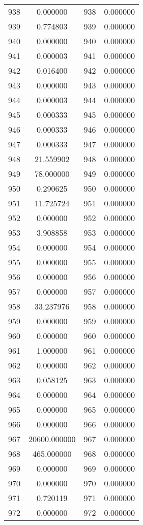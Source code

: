 \documentclass[12pt]{article}
\begin{document}
\begin{longtable}{@{}cccc@{}}
938 & 0.000000 & 938 & 0.000000 \\
939 & 0.774803 & 939 & 0.000000 \\
940 & 0.000000 & 940 & 0.000000 \\
941 & 0.000003 & 941 & 0.000000 \\
942 & 0.016400 & 942 & 0.000000 \\
943 & 0.000000 & 943 & 0.000000 \\
944 & 0.000003 & 944 & 0.000000 \\
945 & 0.000333 & 945 & 0.000000 \\
946 & 0.000333 & 946 & 0.000000 \\
947 & 0.000333 & 947 & 0.000000 \\
948 & 21.559902 & 948 & 0.000000 \\
949 & 78.000000 & 949 & 0.000000 \\
950 & 0.290625 & 950 & 0.000000 \\
951 & 11.725724 & 951 & 0.000000 \\
952 & 0.000000 & 952 & 0.000000 \\
953 & 3.908858 & 953 & 0.000000 \\
954 & 0.000000 & 954 & 0.000000 \\
955 & 0.000000 & 955 & 0.000000 \\
956 & 0.000000 & 956 & 0.000000 \\
957 & 0.000000 & 957 & 0.000000 \\
958 & 33.237976 & 958 & 0.000000 \\
959 & 0.000000 & 959 & 0.000000 \\
960 & 0.000000 & 960 & 0.000000 \\
961 & 1.000000 & 961 & 0.000000 \\
962 & 0.000000 & 962 & 0.000000 \\
963 & 0.058125 & 963 & 0.000000 \\
964 & 0.000000 & 964 & 0.000000 \\
965 & 0.000000 & 965 & 0.000000 \\
966 & 0.000000 & 966 & 0.000000 \\
967 & 20600.000000 & 967 & 0.000000 \\
968 & 465.000000 & 968 & 0.000000 \\
969 & 0.000000 & 969 & 0.000000 \\
970 & 0.000000 & 970 & 0.000000 \\
971 & 0.720119 & 971 & 0.000000 \\
972 & 0.000000 & 972 & 0.000000 \\

\end{longtable}
\end{document}

